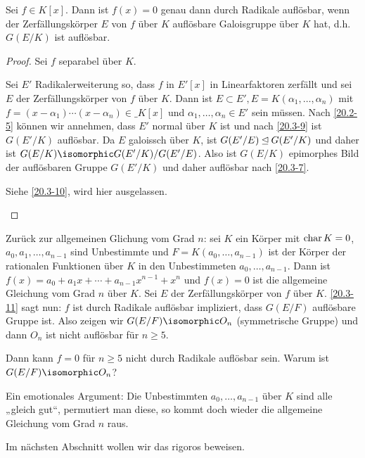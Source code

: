 \begin{kor} \label{20.3-11}
	Sei $f \in K[x]$.
	Dann ist $f(x) = 0$ genau dann durch Radikale auflösbar, wenn der Zerfällungskörper $E$ von $f$ über $K$ auflösbare Galoisgruppe über $K$ hat, d.h. $G(E / K)$ ist auflösbar.
	\begin{proof}
		Sei \oBdA $f$ separabel über $K$.
		\begin{seg}{\ProofImplication}
			Sei $E'$ Radikalerweiterung so, dass $f$ in $E'[x]$ in Linearfaktoren zerfällt und sei $E$ der Zerfällungskörper von $f$ über $K$.
			Dann ist $E \subset E', E = K(\alpha_1, \dotsc, \alpha_n)$ mit $f = (x-\alpha_1) \dotsb (x-\alpha_n) \in \_K[x]$ und $\alpha_1, \dotsc, \alpha_n \in E'$ sein müssen.
			Nach \ref{20.2-5} können wir annehmen, dass $E'$ normal über $K$ ist und nach \ref{20.3-9} ist $G(E' / K)$ auflösbar.
			Da $E$ galoissch über $K$, ist $G(E' / E) \mathbin{\trianglelefteq} G(E' / K)$ und daher ist $G(E / K) \isomorphic G(E' / K) / G(E' / E)$.
			Also ist $G(E / K)$ epimorphes Bild der auflösbaren Gruppe $G(E' / K)$ und daher auflösbar nach \ref{20.3-7}.
		\end{seg}
		\begin{seg}{\ProofImplication*}
			Siehe \ref{20.3-10}, wird hier ausgelassen.
		\end{seg}
	\end{proof}
\end{kor}

Zurück zur allgemeinen Glichung vom Grad $n$:
sei $K$ ein Körper mit $\operatorname{char} K = 0$, $a_0, a_1, \dotsc, a_{n-1}$ sind Unbestimmte und $F = K(a_0, \dotsc, a_{n-1})$ ist der Körper der rationalen Funktionen über $K$ in den Unbestimmeten $a_0, \dotsc, a_{n-1}$.
Dann ist $f(x) = a_0 + a_1 x + \dotsb + a_{n-1} x^{n-1} + x^n$ und $f(x) = 0$ ist die allgemeine Gleichung vom Grad $n$ über $K$.
Sei $E$ der Zerfällungskörper von $f$ über $K$.
\ref{20.3-11} sagt nun: $f$ ist durch Radikale auflösbar impliziert, dass $G(E / F)$ auflösbare Gruppe ist.
Also zeigen wir $G(E / F) \isomorphic O_n$ (symmetrische Gruppe) und dann $O_n$ ist nicht auflösbar für $n \ge 5$.

Dann kann $f = 0$ für $n \ge 5$ nicht durch Radikale auflösbar sein.
Warum ist $G(E / F) \isomorphic O_n$?

Ein emotionales Argument: Die Unbestimmten $a_0, \dotsc, a_{n-1}$ über $K$ sind alle „gleich gut“, permutiert man diese, so kommt doch wieder die allgemeine Gleichung vom Grad $n$ raus.

Im nächsten Abschnitt wollen wir das rigoros beweisen.



